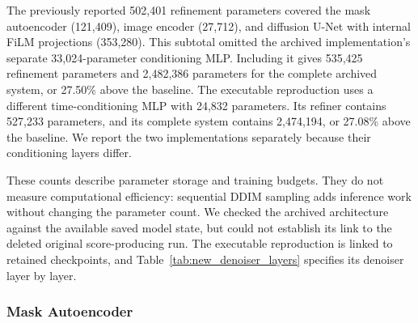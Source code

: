 \documentclass[jimaging,article,submit,pdftex,moreauthors]{Definitions/mdpi}%
\begin{document}
The previously reported 502,401 refinement parameters covered the mask autoencoder (121,409), image encoder (27,712), and diffusion U-Net with internal FiLM projections (353,280). This subtotal omitted the archived implementation's separate 33,024-parameter conditioning MLP. Including it gives 535,425 refinement parameters and 2,482,386 parameters for the complete archived system, or 27.50\% above the baseline. The executable reproduction uses a different time-conditioning MLP with 24,832 parameters. Its refiner contains 527,233 parameters, and its complete system contains 2,474,194, or 27.08\% above the baseline. We report the two implementations separately because their conditioning layers differ.



\begin{table}[htbp]
\centering
\caption{Directly comparable parameter counts using the same convention. Total counts include frozen modules; the last column counts parameters updated during refinement training, when the backbone and mask autoencoder are frozen. The baseline alone has 1,946,961 trainable parameters during its own training.}
\label{tab:complete_parameter_counts}
\small
{}
\end{table}



These counts describe parameter storage and training budgets. They do not measure computational efficiency: sequential DDIM sampling adds inference work without changing the parameter count. We checked the archived architecture against the available saved model state, but could not establish its link to the deleted original score-producing run. The executable reproduction is linked to retained checkpoints, and Table~\ref{tab:new_denoiser_layers} specifies its denoiser layer by layer.



\subsubsection{Mask Autoencoder}
\end{document}
